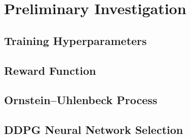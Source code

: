 \section{Preliminary Investigation}


\subsection{Training Hyperparameters}


\subsection{Reward Function}


\subsection{Ornstein–Uhlenbeck Process}


\subsection{DDPG Neural Network Selection}